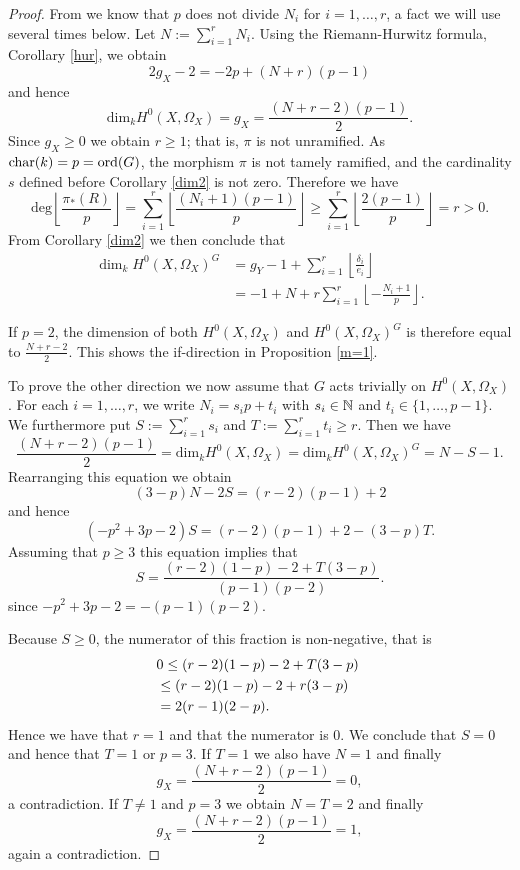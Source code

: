 \begin{proof}
From \cite[Lem. 1]{Naka} we know that $p$ does not divide $N_i$ for $i=1,\ldots ,r$, a fact we will use several times below. 
Let $N:= \sum_{i=1}^r N_i$. 
Using the Riemann-Hurwitz formula, Corollary \ref{hur}, we obtain
\begin{equation}\label{hur2}
2g_X - 2 = -2p + (N+r)(p-1)
\end{equation}
and hence
\[
\textrm{dim}_kH^0(X,\Omega_X) = g_X =\frac{(N+r-2)(p-1)}{2}.
\] 
Since $g_X \ge 0$ we obtain $r \ge 1$; that is, $\pi$ is not unramified. 
As $\operatorname{char}(k) = p = \operatorname{ord}(G)$, the morphism $\pi$ is not tamely ramified, and the cardinality $s$ defined before Corollary \ref{dim2} is not zero.
Therefore we have 
\[
\textrm{deg} \left\lfloor \frac{\pi_*(R)}{p} \right\rfloor =
\sum_{i=1}^r \left\lfloor \frac{(N_i+1)(p-1)}{p}\right\rfloor 
\ge \sum_{i=1}^r \left\lfloor \frac{2(p-1)}{p}\right\rfloor = r > 0.
\] 
From Corollary \ref{dim2} we then conclude that 
\begin{align*}
\dim_kH^0\left(X,\Omega_X\right)^G & =  g_Y - 1 + \sum_{i=1}^r\left\lfloor \frac{\delta_i}{e_i}\right\rfloor \\
& =  -1 + N + r \sum_{i=1}^r\left\lfloor -\frac{N_i+1}{p}\right\rfloor.
\end{align*}

If $p=2$, the dimension of both $H^0(X,\Omega_X)$ and $H^0(X,\Omega_X)^G$ is therefore equal to $\frac{N+r-2}{2}$. 
This shows the if-direction in Proposition \ref{m=1}.



To prove the other direction we now assume that $G$ acts trivially on $H^0(X, \Omega_X)$.
For each $i=1, \ldots, r$, we write $N_i = s_i p +t_i$ with $s_i \in {\mathbb N}$ and $t_i \in \{1, \ldots, p-1\}$. 
We furthermore put $S:=\sum_{i=1}^r s_i$ and $T:= \sum_{i=1}^r t_i \ge r$. 
Then we have
\[ 
\frac{(N+r-2)(p-1)}{2} =\textrm{dim}_kH^0(X,\Omega_X)  = \textrm{dim}_k H^0(X,\Omega_X)^G = N-S-1 .
\]
Rearranging this equation we obtain
\[
(3-p)N - 2S = (r-2)(p-1) +2  
\]
and hence
\[
(-p^2 + 3p -2)S = (r-2)(p-1) +2 - (3-p)T.
\]
Assuming that $p \ge 3$ this equation implies that
\[ 
S = \frac{(r-2)(1-p)-2 + T (3-p)}{(p-1)(p-2)}. 
\]
since $-p^2+3p-2 = - (p-1)(p-2)$. 

Because $S \geq 0$, the numerator of this fraction is non-negative, that is
\begin{align*}
\lefteqn{0 \le (r-2)(1-p) - 2 + T (3-p)}\\
&\le  (r-2)(1-p) - 2 + r (3-p)\\
&= 2 (r-1)(2-p).
\end{align*}
Hence we have that $r=1$ and that the numerator is $0$. 
We conclude that $S=0$ and hence that $T=1$ or $p=3$. 
If $T=1$ we also have $N=1$ and finally
\[
g_X = \frac{(N+r-2)(p-1)}{2} = 0,
\]
a contradiction.
If $T \not=1$ and $p=3$ we obtain $N=T=2$ and finally 
\[
g_X = \frac{(N+r-2)(p-1)}{2} =1,
\] 
again a contradiction.
\end{proof}

